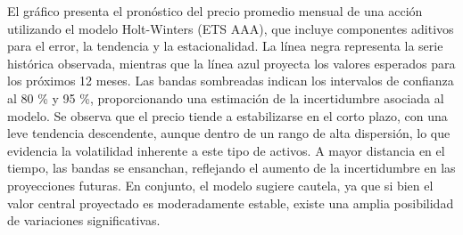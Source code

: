 \documentclass[
  11pt,
]{book}
\begin{document}
El gráfico presenta el pronóstico del precio promedio mensual de una acción utilizando el modelo Holt-Winters (ETS AAA), que incluye componentes aditivos para el error, la tendencia y la estacionalidad. La línea negra representa la serie histórica observada, mientras que la línea azul proyecta los valores esperados para los próximos 12 meses. Las bandas sombreadas indican los intervalos de confianza al 80 \% y 95 \%, proporcionando una estimación de la incertidumbre asociada al modelo. Se observa que el precio tiende a estabilizarse en el corto plazo, con una leve tendencia descendente, aunque dentro de un rango de alta dispersión, lo que evidencia la volatilidad inherente a este tipo de activos. A mayor distancia en el tiempo, las bandas se ensanchan, reflejando el aumento de la incertidumbre en las proyecciones futuras. En conjunto, el modelo sugiere cautela, ya que si bien el valor central proyectado es moderadamente estable, existe una amplia posibilidad de variaciones significativas.
\end{document}
